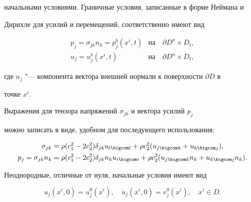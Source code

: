начальными условиями. Граничные условия, записанные в форме Неймана и

Дирихле для усилий и перемещений, соответственно имеют вид

\begin{equation}

\label{petu:eq6}

\begin{array}{ll}

p_j =\sigma _{jk} n_k =p_j^b (x^i,t) & \text{на} \quad \partial D^\sigma \times D_t,\\

u_j  = u_j^b (x^i,t) & \text{на}\quad \partial D^u\times D_t ,

\end{array}

\end{equation}

где $n_j $ "--- компонента вектора внешней нормали к поверхности $\partial D$ в

точке $x^i$.



Выражения для тензора напряжений $\sigma _{jk} $ и вектора усилий $p_j $

можно записать в виде, удобном для последующего использования:

\begin{gather}

\label{petu:eq7}

\sigma _{jk} =\rho (c_1^2 -2c_2^2 )\delta _{jk} u_{l \bigcom l} +\rho c_2^2 (u_{j \bigcom k}

+u_{k \bigcom j} ),\\

\label{petu:eq8}

p_j =\sigma _{jk} n_k =\rho (c_1^2 -2c_2^2 )\delta _{jk} n_k u_{i \bigcom i} +\rho

c_2^2 (u_{j \bigcom k} n_k +u_{k\bigcom j} n_k ).

\end{gather}

Неоднородные, отличные от нуля, начальные условия имеют вид

\begin{equation}

\label{petu:eq9}

u_j (x^i, 0)=u_j^0 (x^i), \quad \dot {u}_j (x^i, 0)=v_j^0 (x^i), \quad x^i\in D.

\end{equation}




